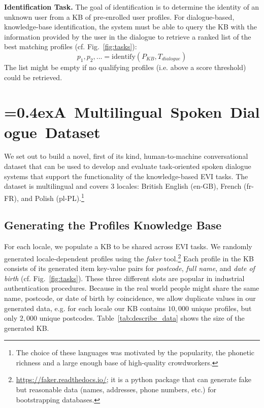 \documentclass[11pt]{article}
\newcommand{\rparagraph}[1]{\vspace{1.4mm}\noindent\textbf{#1.}}
\begin{document}
{\rparagraph{Identification Task}
The goal of identification is to
determine the identity of an unknown user
from a KB of pre-enrolled user profiles.
For dialogue-based, knowledge-base identification,
the system must be able to query the KB with the information provided by the user in the dialogue to retrieve a ranked list of the best matching profiles
(cf. Fig.~\ref{fig:tasks}):
\begin{equation}
p_{1}, p_{2}, ...  = {\textrm{identify}}(P_\textit{KB}, T_\textit{dialogue})
\end{equation}
The list might be empty if no qualifying profiles (i.e. above a score threshold) could be retrieved.

 

\section{{\font=0.4ex{A~Multilingual~Spoken~Dialogue~Dataset}}}
\label{sec:data}

We set out to build a novel, first of its kind, human-to-machine conversational dataset that can be used to develop and evaluate task-oriented spoken dialogue systems that support the functionality of the knowledge-based EVI tasks. The dataset is multilingual and covers $3$ locales: British English (en-GB), French (fr-FR), and Polish (pl-PL).\footnote{The choice of these languages was motivated by the popularity, the phonetic richness and a large enough base of high-quality crowdworkers.}

\subsection{Generating the Profiles Knowledge Base} \label{sec:kb-generation}

For each locale, we populate a KB to be shared across EVI tasks.
We randomly generated locale-dependent profiles using the \textit{faker} tool.\footnote{\url{https://faker.readthedocs.io/}; it is a python package that can generate fake but reasonable data (names, addresses, phone numbers, etc.) for bootstrapping databases.} Each profile in the KB consists of its generated item key-value pairs for \textit{postcode}, \textit{full name}, and \textit{date of birth} (cf. Fig.~\ref{fig:tasks}). These three different slots are popular in industrial authentication procedures. Because in the real world people might share the same
name, postcode, or date of birth by coincidence,
we allow duplicate values in our generated data,
e.g. for each locale our KB contains $10,000$ unique profiles,
but only $2,000$ unique postcodes. Table~\ref{tab:describe_data} shows the size of the generated KB.


}
\end{document}
